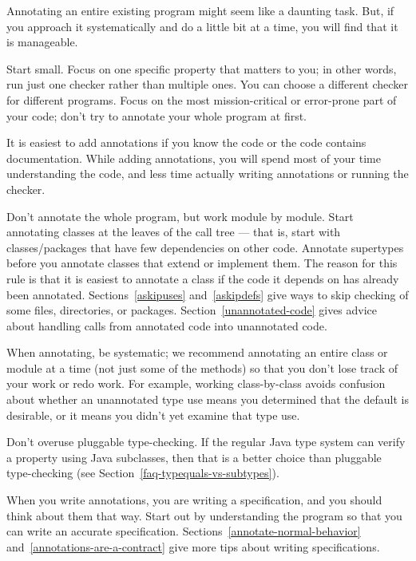 
Annotating an entire existing program might seem like a daunting task.  But,
if you approach it systematically and do a little bit at a time, you will
find that it is manageable.


Start small.  Focus on one specific property that matters to you; in
other words, run just one checker rather than multiple ones.  You can
choose a different checker for different programs.
Focus on
the most mission-critical or error-prone part of your code; don't try to
annotate your whole program at first.

It is easiest to add annotations if you know the code or the
code contains documentation.  While adding annotations, you will spend most of your time
understanding the code, and less time actually writing annotations
or running the checker.

Don't annotate the whole program, but work module by module.
Start annotating classes at the leaves of the call tree ---
that is,
start with classes/packages that have few dependencies on other
code.
Annotate supertypes before you
annotate classes that extend or implement them.
The reason for this rule is that it is
easiest to annotate a class if the code it depends on has already been
annotated.
Sections~\ref{askipuses} and~\ref{askipdefs} give ways to skip
checking of some files, directories, or packages.
Section~\ref{unannotated-code} gives advice about handling calls from
annotated code into unannotated code.

When annotating, be systematic; we recommend
annotating an entire class or module at a time (not just some of the methods)
so that you don't lose track of your work or redo work.  For example,
working class-by-class avoids confusion about whether an unannotated type use
means you determined that the default is desirable, or it means you didn't
yet examine that type use.

Don't overuse pluggable type-checking.  If the regular Java type system can
verify a property using Java subclasses, then that is a better choice than
pluggable type-checking (see Section~\ref{faq-typequals-vs-subtypes}).



When you write annotations, you are writing a specification, and you should
think about them that way.  Start out by understanding the program so that
you can write an accurate specification.
Sections~\ref{annotate-normal-behavior}
and~\ref{annotations-are-a-contract} give more tips about writing
specifications.

